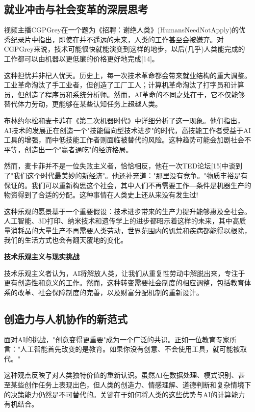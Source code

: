 \subsection{就业冲击与社会变革的深层思考}

视频主播CGPGrey在一个题为《招聘：谢绝人类》(HumansNeedNotApply)的优秀纪录片中指出，即使在并不遥远的未来，人类的工作甚至会被嫌弃。对CGPGrey来说，技术可能很快就能演变到这样的地步，以后(几乎)人类能完成的工作都可以由机器以更低廉的价格更好地完成[14]。

这种担忧并非杞人忧天。历史上，每一次技术革命都会带来就业结构的重大调整。工业革命淘汰了手工业者，但创造了工厂工人；计算机革命淘汰了打字员和计算员，但创造了程序员和系统分析师。然而，AI革命的不同之处在于，它不仅能够替代体力劳动，更能够在某些认知任务上超越人类。

布林约尔松和麦卡菲在《第二次机器时代》中详细分析了这一现象。他们指出，AI技术的发展正在创造一个"技能偏向型技术进步"的时代，高技能工作者受益于AI工具的增强，而中低技能工作者则面临被替代的风险。这种趋势可能会加剧社会不平等，创造出一个"赢者通吃"的经济格局。

然而，麦卡菲并不是一位失败主义者，恰恰相反，他在一次TED论坛[15]中谈到了"我们这个时代最美妙的新经济"。他还补充道："那里没有竞争。"物质丰裕是有保证的。我们可以重新构思这个社会，其中人们不再需要工作---条件是机器生产的物资得到了合适的分配。这种事情在人类史上还从来没有发生过!

这种乐观的愿景基于一个重要假设：技术进步带来的生产力提升能够惠及全社会。人工智能、3D打印、纳米技术和遗传学上的进步都昭示着这样的未来，其中高质量消耗品的大量生产不再需要人类劳动，世界范围内的饥荒和疾病都能得以根除，我们的生活方式也会有翻天覆地的变化。

\begin{hintbox}
{\bf 技术乐观主义与现实挑战}

技术乐观主义者认为，AI将解放人类，让我们从重复性劳动中解脱出来，专注于更有创造性和意义的工作。然而，这种转变需要社会制度的相应调整，包括教育体系的改革、社会保障制度的完善，以及财富分配机制的重新设计。
\end{hintbox}

\subsection{创造力与人机协作的新范式}

面对AI的挑战，"创意变得更重要"成为一个广泛的共识。正如一位教育专家所言："人工智能首先改变的是教育。如果你没有创意、不会使用工具，就可能被取代。"

这种观点反映了对人类独特价值的重新认识。虽然AI在数据处理、模式识别、甚至某些创作任务上表现出色，但人类的创造力、情感理解、道德判断和复杂情境下的决策能力仍然是不可替代的。关键在于如何将人类的这些优势与AI的计算能力有机结合。

